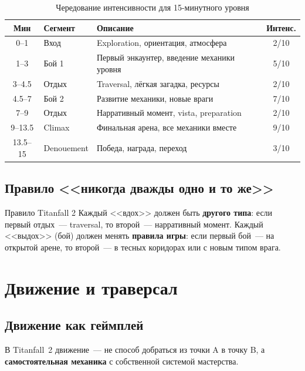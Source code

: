 \documentclass[a4paper,11pt]{report}
\begin{document}
\begin{table}[H]
\centering
\caption{Чередование интенсивности для 15-минутного уровня}
\begin{tabularx}{\textwidth}{@{}clXc@{}}
\toprule
\textbf{Мин} & \textbf{Сегмент} & \textbf{Описание} & \textbf{Интенс.} \\
\midrule
0--1 & Вход & Exploration, ориентация, атмосфера & 2/10 \\
1--3 & Бой 1 & Первый энкаунтер, введение механики уровня & 5/10 \\
3--4.5 & Отдых & Traversal, лёгкая загадка, ресурсы & 2/10 \\
4.5--7 & Бой 2 & Развитие механики, новые враги & 7/10 \\
7--9 & Отдых & Нарративный момент, vista, preparation & 2/10 \\
9--13.5 & Climax & Финальная арена, все механики вместе & 9/10 \\
13.5--15 & Denouement & Победа, награда, переход & 3/10 \\
\bottomrule
\end{tabularx}
\end{table}

\section{Правило <<никогда дважды одно и то же>>}

\begin{principle}{Правило Titanfall 2}
Каждый <<вдох>> должен быть \textbf{другого типа}:
если первый отдых~--- traversal, то второй~--- нарративный момент.
Каждый <<выдох>> (бой) должен менять \textbf{правила игры}:
если первый бой~--- на открытой арене, то второй~--- в тесных
коридорах или с новым типом врага.
\end{principle}


\chapter{Движение и траверсал}

\section{Движение как геймплей}

В Titanfall~2 движение~--- не способ добраться из точки A в точку B,
а \textbf{самостоятельная механика} с собственной системой мастерства.
\end{document}
